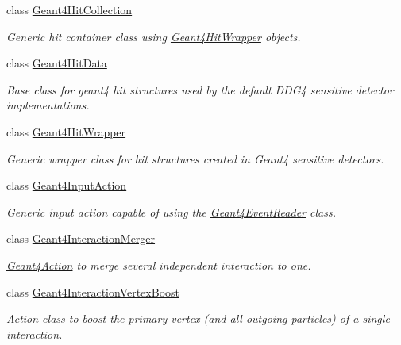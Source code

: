 \begin{DoxyCompactItemize}
class \hyperlink{class_d_d4hep_1_1_simulation_1_1_geant4_hit_collection}{Geant4\+Hit\+Collection}
\begin{DoxyCompactList}\small\item\em Generic hit container class using \hyperlink{class_d_d4hep_1_1_simulation_1_1_geant4_hit_wrapper}{Geant4\+Hit\+Wrapper} objects. \end{DoxyCompactList}\item 
class \hyperlink{class_d_d4hep_1_1_simulation_1_1_geant4_hit_data}{Geant4\+Hit\+Data}
\begin{DoxyCompactList}\small\item\em Base class for geant4 hit structures used by the default D\+D\+G4 sensitive detector implementations. \end{DoxyCompactList}\item 
class \hyperlink{class_d_d4hep_1_1_simulation_1_1_geant4_hit_wrapper}{Geant4\+Hit\+Wrapper}
\begin{DoxyCompactList}\small\item\em Generic wrapper class for hit structures created in Geant4 sensitive detectors. \end{DoxyCompactList}\item 
class \hyperlink{class_d_d4hep_1_1_simulation_1_1_geant4_input_action}{Geant4\+Input\+Action}
\begin{DoxyCompactList}\small\item\em Generic input action capable of using the \hyperlink{class_d_d4hep_1_1_simulation_1_1_geant4_event_reader}{Geant4\+Event\+Reader} class. \end{DoxyCompactList}\item 
class \hyperlink{class_d_d4hep_1_1_simulation_1_1_geant4_interaction_merger}{Geant4\+Interaction\+Merger}
\begin{DoxyCompactList}\small\item\em \hyperlink{class_d_d4hep_1_1_simulation_1_1_geant4_action}{Geant4\+Action} to merge several independent interaction to one. \end{DoxyCompactList}\item 
class \hyperlink{class_d_d4hep_1_1_simulation_1_1_geant4_interaction_vertex_boost}{Geant4\+Interaction\+Vertex\+Boost}
\begin{DoxyCompactList}\small\item\em Action class to boost the primary vertex (and all outgoing particles) of a single interaction. \end{DoxyCompactList}\item 

\end{DoxyCompactItemize}
